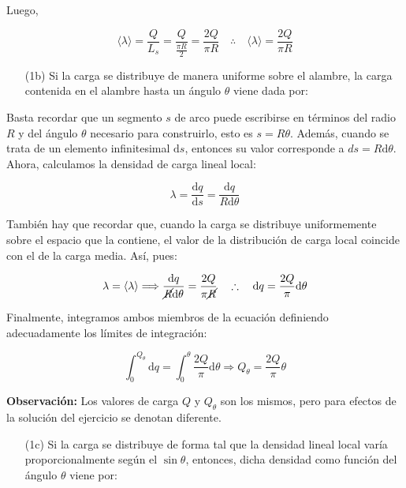 \documentclass[a4paper,10pt]{article}
\begin{document}
Luego,

\begin{equation*}
    \langle\lambda\rangle=\frac{Q}{L_{s}}=\frac{Q}{\frac{\pi R}{2}}=\frac{2Q}{\pi R}
    \quad\therefore\quad\boxed{\langle\lambda\rangle=\frac{2Q}{\pi R}}
\end{equation*}

\begin{itemize}
    \item[(1b)]Si la carga se distribuye de manera uniforme sobre el alambre,
    la carga contenida en el alambre hasta un ángulo $\theta$ viene dada por:
\end{itemize}

Basta recordar que un segmento $s$ de arco puede escribirse en t\'erminos del
radio $R$ y del \'angulo $\theta$ necesario para construirlo, esto es $s=R\theta$. Adem\'as,
cuando se trata de un elemento infinitesimal $\mathrm{d}s$, entonces su valor corresponde a
$ds=R\mathrm{d}\theta$. Ahora, calculamos la densidad de carga lineal local:

\begin{equation*}
    \lambda=\frac{\mathrm{d}q}{\mathrm{d}s}=\frac{\mathrm{d}q}{R\mathrm{d}\theta}
\end{equation*}

Tambi\'en hay que recordar que, cuando la carga se distribuye uniformemente sobre
el espacio que la contiene, el valor de la distribuci\'on de carga local coincide
con el de la carga media. As\'i, pues:

\begin{equation*}
    \lambda=\langle\lambda\rangle\Longrightarrow
    \frac{\mathrm{d}q}{\cancel{R}\mathrm{d}\theta}=\frac{2Q}{\pi \cancel{R}}
    \quad\therefore\quad\mathrm{d}q=\frac{2Q}{\pi}\mathrm{d}\theta
\end{equation*}

Finalmente, integramos ambos miembros de la ecuaci\'on definiendo adecuadamente
los l\'imites de integraci\'on:

\begin{equation*}
    \int_{0}^{Q_{\theta}} \mathrm{d}q = \int_{0}^{\theta} \frac{2Q}{\pi}\mathrm{d}\theta
    \Longrightarrow \boxed{Q_{\theta}=\frac{2Q}{\pi}\theta}
\end{equation*}

\textbf{Observaci\'on:} Los valores de carga $Q$ y $Q_{\theta}$ son los mismos,
pero para efectos de la soluci\'on del ejercicio se denotan diferente.

\begin{itemize}
    \item[(1c)]Si la carga se distribuye de forma tal que la densidad lineal local
    varía proporcionalmente según el $\sin\theta$, entonces, dicha densidad como función
    del ángulo $\theta$ viene por:
\end{itemize}
\end{document}
